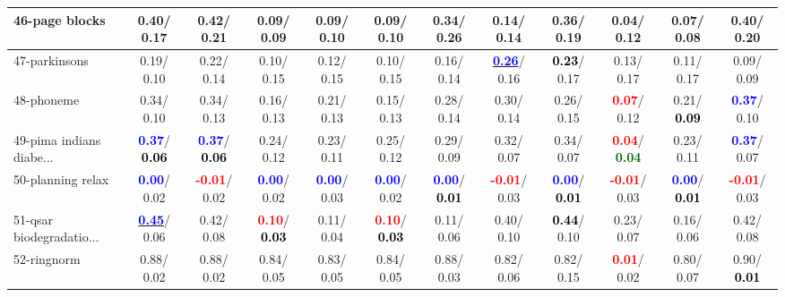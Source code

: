 \begin{table}[h]
\begin{center}
{\begin{tabular}{lc|c|c|c|c|c|c|c|c|c|c}
46-page blocks &   0.40/  0.17 &   0.42/  0.21 &   0.09/  0.09 &   0.09/  0.10 &   0.09/  0.10 &   0.34/  0.26 &   0.14/  0.14 &   0.36/  0.19 &   0.04/  0.12 &   0.07/  0.08 &   0.40/  0.20 \\ \hline
47-parkinsons &   0.19/  0.10 &   0.22/  0.14 &   0.10/  0.15 &   0.12/  0.15 &   0.10/  0.15 &   0.16/  0.14 & \underline{\textcolor{blue}{\textbf{  0.26}}}/  0.16 & \textcolor{black}{\textbf{  0.23}}/  0.17 &   0.13/  0.17 &   0.11/  0.17 &   0.09/  0.09 \\
48-phoneme &   0.34/  0.10 &   0.34/  0.13 &   0.16/  0.13 &   0.21/  0.13 &   0.15/  0.13 &   0.28/  0.14 &   0.30/  0.14 &   0.26/  0.15 & \textcolor{red}{\textbf{  0.07}}/  0.12 &   0.21/\textcolor{black}{\textbf{  0.09}} & \textcolor{blue}{\textbf{  0.37}}/  0.10 \\
49-pima indians diabe... & \textcolor{blue}{\textbf{  0.37}}/\textcolor{black}{\textbf{  0.06}} & \textcolor{blue}{\textbf{  0.37}}/\textcolor{black}{\textbf{  0.06}} &   0.24/  0.12 &   0.23/  0.11 &   0.25/  0.12 &   0.29/  0.09 &   0.32/  0.07 &   0.34/  0.07 & \textcolor{red}{\textbf{  0.04}}/\textcolor{darkgreen}{\textbf{  0.04}} &   0.23/  0.11 & \textcolor{blue}{\textbf{  0.37}}/  0.07 \\
50-planning relax & \textcolor{blue}{\textbf{  0.00}}/  0.02 & \textcolor{red}{\textbf{ -0.01}}/  0.02 & \textcolor{blue}{\textbf{  0.00}}/  0.02 & \textcolor{blue}{\textbf{  0.00}}/  0.03 & \textcolor{blue}{\textbf{  0.00}}/  0.02 & \textcolor{blue}{\textbf{  0.00}}/\textcolor{black}{\textbf{  0.01}} & \textcolor{red}{\textbf{ -0.01}}/  0.03 & \textcolor{blue}{\textbf{  0.00}}/\textcolor{black}{\textbf{  0.01}} & \textcolor{red}{\textbf{ -0.01}}/  0.03 & \textcolor{blue}{\textbf{  0.00}}/\textcolor{black}{\textbf{  0.01}} & \textcolor{red}{\textbf{ -0.01}}/  0.03 \\
51-qsar biodegradatio... & \underline{\textcolor{blue}{\textbf{  0.45}}}/  0.06 &   0.42/  0.08 & \textcolor{red}{\textbf{  0.10}}/\textcolor{black}{\textbf{  0.03}} &   0.11/  0.04 & \textcolor{red}{\textbf{  0.10}}/\textcolor{black}{\textbf{  0.03}} &   0.11/  0.06 &   0.40/  0.10 & \textcolor{black}{\textbf{  0.44}}/  0.10 &   0.23/  0.07 &   0.16/  0.06 &   0.42/  0.08 \\
52-ringnorm &   0.88/  0.02 &   0.88/  0.02 &   0.84/  0.05 &   0.83/  0.05 &   0.84/  0.05 &   0.88/  0.03 &   0.82/  0.06 &   0.82/  0.15 & \textcolor{red}{\textbf{  0.01}}/  0.02 &   0.80/  0.07 &   0.90/\textcolor{black}{\textbf{  0.01}} \\

\end{tabular}}
\end{center}
\end{table}
